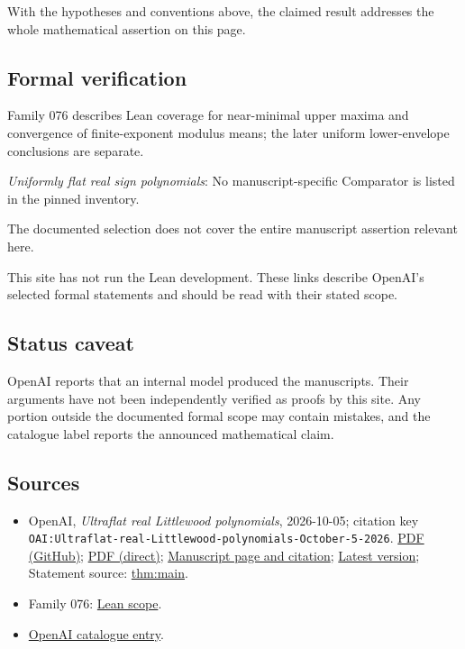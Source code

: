 \documentclass[11pt]{article}
\begin{document}
With the hypotheses and conventions above, the claimed result addresses the whole mathematical assertion on this page.

\subsection{Formal verification}
Family 076 describes Lean coverage for near-minimal upper maxima and convergence of finite-exponent modulus means; the later uniform lower-envelope conclusions are separate.

\textit{Uniformly flat real sign polynomials}: No manuscript-specific Comparator is listed in the pinned inventory.

The documented selection does not cover the entire manuscript assertion relevant here.

This site has not run the Lean development. These links describe OpenAI’s selected formal statements and should be read with their stated scope.

\subsection{Status caveat}
OpenAI reports that an internal model produced the manuscripts. Their arguments have not been independently verified as proofs by this site. Any portion outside the documented formal scope may contain mistakes, and the catalogue label reports the announced mathematical claim.

\subsection{Sources}
\begin{itemize}
\item OpenAI, \emph{Ultraflat real Littlewood polynomials}, 2026-10-05; citation key \texttt{OAI:Ultraflat-real-Littlewood-polynomials-October-5-2026}. \href{https://github.com/openai/math/blob/adc7f1241b42e322a6451854ab7e4b4c146bf78a/preprints/Ultraflat-real-Littlewood-polynomials-October-5-2026/ultraflat-real-littlewood-polynomials.pdf}{PDF (GitHub)}; \href{https://github.com/openai/math/raw/adc7f1241b42e322a6451854ab7e4b4c146bf78a/preprints/Ultraflat-real-Littlewood-polynomials-October-5-2026/ultraflat-real-littlewood-polynomials.pdf}{PDF (direct)}; \href{https://github.com/openai/math/blob/adc7f1241b42e322a6451854ab7e4b4c146bf78a/preprints/Ultraflat-real-Littlewood-polynomials-October-5-2026/README.md}{Manuscript page and citation}; \href{https://github.com/openai/math/blob/main/preprints/Ultraflat-real-Littlewood-polynomials-October-5-2026/ultraflat-real-littlewood-polynomials.pdf}{Latest version}; Statement source: \href{https://github.com/openai/math/blob/adc7f1241b42e322a6451854ab7e4b4c146bf78a/preprints/Ultraflat-real-Littlewood-polynomials-October-5-2026/build/sections/introduction.tex\#L15}{thm:main}.
\item Family 076: \href{https://github.com/openai/math/blob/adc7f1241b42e322a6451854ab7e4b4c146bf78a/lean/docs/076.md}{Lean scope}.
\item \href{https://github.com/openai/math/blob/adc7f1241b42e322a6451854ab7e4b4c146bf78a/CONTENTS.md}{OpenAI catalogue entry}.
\end{itemize}
\end{document}
